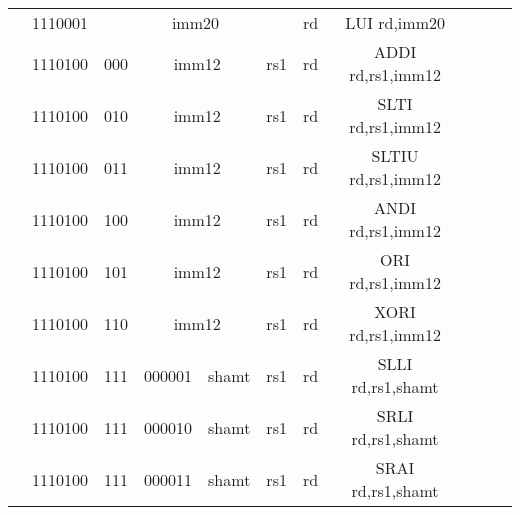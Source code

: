 \begin{table}[p]
\begin{small}
\begin{center}
\begin{tabular}{rcccccccccccl}
&
\multicolumn{1}{|c|}{1110001} &
\multicolumn{6}{c|}{imm20} &
\multicolumn{1}{c|}{rd} & LUI rd,imm20 \\
\cline{2-9}
  

&
\multicolumn{1}{|c|}{1110100} &
\multicolumn{1}{c|}{000} &
\multicolumn{4}{c|}{imm12} &
\multicolumn{1}{c|}{rs1} &
\multicolumn{1}{c|}{rd} & ADDI rd,rs1,imm12 \\
\cline{2-9}
  

&
\multicolumn{1}{|c|}{1110100} &
\multicolumn{1}{c|}{010} &
\multicolumn{4}{c|}{imm12} &
\multicolumn{1}{c|}{rs1} &
\multicolumn{1}{c|}{rd} & SLTI rd,rs1,imm12 \\
\cline{2-9}
  

&
\multicolumn{1}{|c|}{1110100} &
\multicolumn{1}{c|}{011} &
\multicolumn{4}{c|}{imm12} &
\multicolumn{1}{c|}{rs1} &
\multicolumn{1}{c|}{rd} & SLTIU rd,rs1,imm12 \\
\cline{2-9}
  

&
\multicolumn{1}{|c|}{1110100} &
\multicolumn{1}{c|}{100} &
\multicolumn{4}{c|}{imm12} &
\multicolumn{1}{c|}{rs1} &
\multicolumn{1}{c|}{rd} & ANDI rd,rs1,imm12 \\
\cline{2-9}
  

&
\multicolumn{1}{|c|}{1110100} &
\multicolumn{1}{c|}{101} &
\multicolumn{4}{c|}{imm12} &
\multicolumn{1}{c|}{rs1} &
\multicolumn{1}{c|}{rd} & ORI rd,rs1,imm12 \\
\cline{2-9}
  

&
\multicolumn{1}{|c|}{1110100} &
\multicolumn{1}{c|}{110} &
\multicolumn{4}{c|}{imm12} &
\multicolumn{1}{c|}{rs1} &
\multicolumn{1}{c|}{rd} & XORI rd,rs1,imm12 \\
\cline{2-9}
  

&
\multicolumn{1}{|c|}{1110100} &
\multicolumn{1}{c|}{111} &
\multicolumn{2}{c|}{000001} &
\multicolumn{2}{c|}{shamt} &
\multicolumn{1}{c|}{rs1} &
\multicolumn{1}{c|}{rd} & SLLI rd,rs1,shamt \\
\cline{2-9}
  

&
\multicolumn{1}{|c|}{1110100} &
\multicolumn{1}{c|}{111} &
\multicolumn{2}{c|}{000010} &
\multicolumn{2}{c|}{shamt} &
\multicolumn{1}{c|}{rs1} &
\multicolumn{1}{c|}{rd} & SRLI rd,rs1,shamt \\
\cline{2-9}
  

&
\multicolumn{1}{|c|}{1110100} &
\multicolumn{1}{c|}{111} &
\multicolumn{2}{c|}{000011} &
\multicolumn{2}{c|}{shamt} &
\multicolumn{1}{c|}{rs1} &
\multicolumn{1}{c|}{rd} & SRAI rd,rs1,shamt \\
\cline{2-9}
  


\end{tabular}
\end{center}
\end{small}
\end{table}
